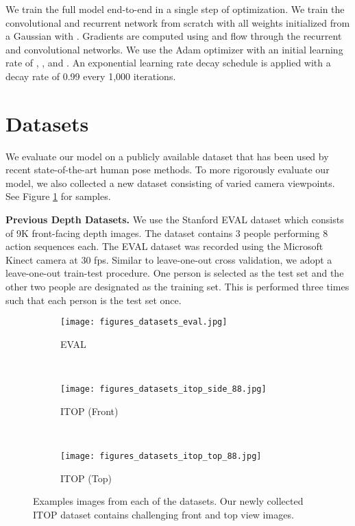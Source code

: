 \documentclass[runningheads]{llncs}
\begin{document}
	We train the full model end-to-end in a single step of optimization. We train the convolutional and recurrent network from scratch with all weights initialized from a Gaussian with . Gradients are computed using  and flow through the recurrent and convolutional networks. We use the Adam \cite{kingma2014adam} optimizer with an initial learning rate of , , and . An exponential learning rate decay schedule is applied with a decay rate of 0.99 every 1,000 iterations.

	\section{Datasets}\label{sec:datasets}
	We evaluate our model on a publicly available dataset that has been used by recent state-of-the-art human pose methods. To more rigorously evaluate our model, we also collected a new dataset consisting of varied camera viewpoints. See Figure \ref{fig:datasets} for samples.

	\textbf{Previous Depth Datasets. }
	We use the Stanford EVAL dataset \cite{ganapathi2012real} which consists of 9K front-facing depth images. The dataset contains 3 people performing 8 action sequences each. The EVAL dataset was recorded using the Microsoft Kinect camera at 30 fps.  Similar to leave-one-out cross validation, we adopt a leave-one-out train-test procedure. One person is selected as the test set and the other two people are designated as the training set. This is performed three times such that each person is the test set once.

	\begin{figure}[t]
		\centering
		\begin{subfigure}[b]{0.3\linewidth}
			\texttt{[image: figures\_datasets\_eval.jpg]}
			\caption{EVAL \cite{ganapathi2012real}}
		\end{subfigure}
		~
		\begin{subfigure}[b]{0.3\linewidth}
			\texttt{[image: figures\_datasets\_itop\_side\_88.jpg]}
			\caption{ITOP (Front)}
		\end{subfigure}
		~
		\begin{subfigure}[b]{0.3\linewidth}
			\texttt{[image: figures\_datasets\_itop\_top\_88.jpg]}
			\caption{ITOP (Top)}
		\end{subfigure}
		\caption{Examples images from each of the datasets. Our newly collected ITOP dataset contains challenging front and top view images.}\label{fig:datasets}
	\end{figure}
\end{document}
